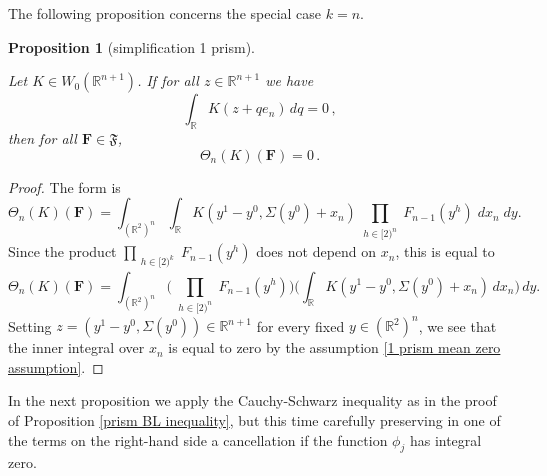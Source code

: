 \documentclass[12pt,reqno]{amsart}
\theoremstyle{plain}
\newtheorem{proposition}[theorem]{Proposition}
\numberwithin{equation}{section}
\theoremstyle{remark}
\newcommand{\uses}[1]{}
\newcommand{\usesdefs}[1]{}
\newcommand{\leanok}{}
\newcommand{\lean}[1]{}
\newcommand{\R}{{\mathbb R}}
\newcommand{\F}{\mathbf{F}}
\begin{document}
The following proposition concerns the special case $k=n$.
\begin{proposition}[simplification 1 prism]\label{simplification 1 prism}\uses{}\usesdefs{auto:Wiener-space-definition,normalized function tuples,prism Brascamp--Lieb}
\lean{Auto.simplificationOnePrism}
\leanok
    Let $K\in W_0(\R^{n+1})$. If for all $z\in \R^{n+1}$ we have
    \begin{equation}\label{1 prism mean zero assumption}
        \int_\R K(z+qe_n)\, dq=0\, ,
    \end{equation}
    then for all $\F\in \mathfrak{F}$,
    \begin{equation}\label{auto:terminal-K-form-zero}
         \Theta_n(K)(\F)= 0\, .
    \end{equation}
\end{proposition}
\begin{proof}
The form is
\[ \Theta_{n}(K)(\F) = \int_{(\R^{2})^n} \int_{\R} K(y^1-y^0, \Sigma(y^0) + x_n)
\prod_{\substack{h\in [2)^n}} F_{n-1}( y^h)\;dx_n\;dy. \]
Since the product $\prod_{\substack{h\in [2)^k}} F_{n-1}( y^h)$ does not depend on $x_n$, this is equal to
\[\Theta_n(K)(\F) = \int_{(\R^{2})^n} \Big( \prod_{\substack{h\in [2)^n}} F_{n-1}( y^h) \Big) \Big(\int_{\R} K(y^1-y^0, \Sigma(y^0) + x_n)\,dx_n\Big)\,dy. \]
Setting $z=(y^1-y^0, \Sigma(y^0))\in\R^{n+1}$ for every fixed $y\in (\R^2)^n$, we see that the inner integral over $x_n$ is equal to zero by the assumption \eqref{1 prism mean zero assumption}.
\end{proof}


In the next proposition we apply the Cauchy-Schwarz inequality as in the proof of Proposition \ref{prism BL inequality}, but this time carefully preserving in one of the terms on the right-hand side
a cancellation if the function $\phi_j$ has integral zero.
\end{document}
